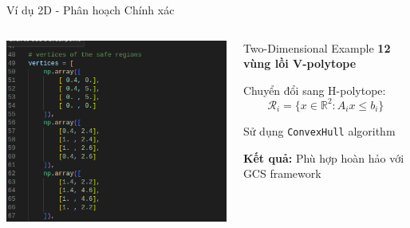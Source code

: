 \documentclass[aspectratio=169]{beamer}
\begin{document}
\begin{frame}{Ví dụ 2D - Phân hoạch Chính xác}
    \begin{columns}[c]
        \includegraphics[width=\textwidth]{../imgs/2d-decompose.png}

        \begin{block}{Two-Dimensional Example}
            \small
            \textbf{12 vùng lồi V-polytope}

            \vspace{0.3cm}
            Chuyển đổi sang H-polytope:
            \[
                \mathcal{R}_i = \{x \in \mathbb{R}^2 : A_i x \leq b_i\}
            \]

            \vspace{0.3cm}
            Sử dụng \texttt{ConvexHull} algorithm

            \vspace{0.3cm}
            \textbf{Kết quả:} Phù hợp hoàn hảo với GCS framework
        \end{block}
    \end{columns}
\end{frame}
\end{document}
